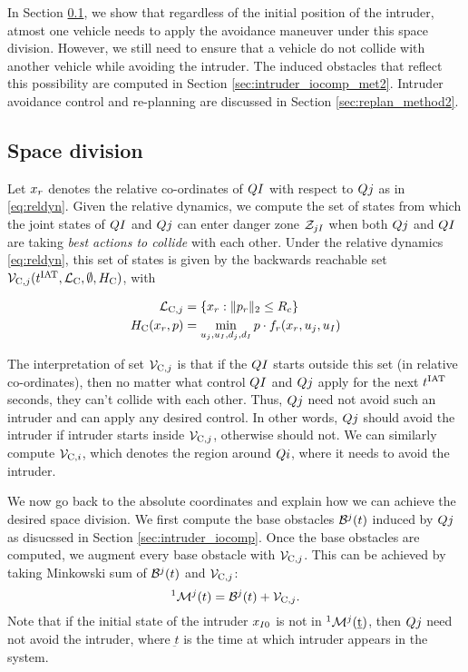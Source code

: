 In Section \ref{sec:spaceDiv}, we show that regardless of the initial position of the intruder, atmost one vehicle needs to apply the avoidance maneuver under this space division. However, we still need to ensure that a vehicle do not collide with another vehicle while avoiding the intruder. The induced obstacles that reflect this possibility are computed in Section \ref{sec:intruder_iocomp_met2}. Intruder avoidance control and re-planning are discussed in Section \ref{sec:replan_method2}.

\subsection{Space division} \label{sec:spaceDiv}
Let $x_r$ denotes the relative co-ordinates of $Q{I}$ with respect to $Q{j}$ as in \eqref{eq:reldyn}. Given the relative dynamics, we compute the set of states from which the joint states of $Q{I}$ and $Q{j}$ can enter danger zone $\mathcal{Z}_{jI}$ when both $Q{j}$ and $Q{I}$ are taking \textit{best actions to collide} with each other. Under the relative dynamics \eqref{eq:reldyn}, this set of states is given by the backwards reachable set $\mathcal{V}_{\text{C},j}(t^\text{IAT}, \mathcal{L}_\text{C}, \emptyset, H_\text{C})$, with

\begin{equation}
\begin{aligned}
\mathcal{L}_{\text{C},j} &= \{x_r: \|p_r\|_2 \le R_c\} \\
H_\text{C}(x_r, p) &= \min_{u_j, u_I, d_j, d_I} p \cdot f_r(x_r, u_j, u_I)
\end{aligned}
\end{equation}

The interpretation of set $\mathcal{V}_{\text{C},j}$ is that if the $Q{I}$ starts outside this set (in relative co-ordinates), then no matter what control $Q{I}$ and $Q{j}$ apply for the next $t^\text{IAT}$ seconds, they can't collide with each other. Thus, $Q{j}$ need not avoid such an intruder and can apply any desired control. In other words, $Q{j}$ should avoid the intruder if intruder starts inside $\mathcal{V}_{\text{C},j}$, otherwise should not. We can similarly compute $\mathcal{V}_{\text{C},i}$, which denotes the region around $Q{i}$, where it needs to avoid the intruder. 

We now go back to the absolute coordinates and explain how we can achieve the desired space division. We first compute the base obstacles $\mathcal{B}^j(t)$ induced by $Q{j}$ as disucssed in Section \ref{sec:intruder_iocomp}. Once the base obstacles are computed, we augment every base obstacle with $\mathcal{V}_{\text{C},j}$. This can be achieved by taking Minkowski sum of $\mathcal{B}^j(t)$ and $\mathcal{V}_{\text{C},j}$:
\begin{equation}
^1\mathcal{M}^j(t) = \mathcal{B}^j(t) + \mathcal{V}_{\text{C},j}.
\end{equation}
Note that if the initial state of the intruder $x_{I0}$ is not in $^1\mathcal{M}^j(\underbar{t})$, then $Q{j}$ need not avoid the intruder, where $\underbar{t}$ is the time at which intruder appears in the system.

